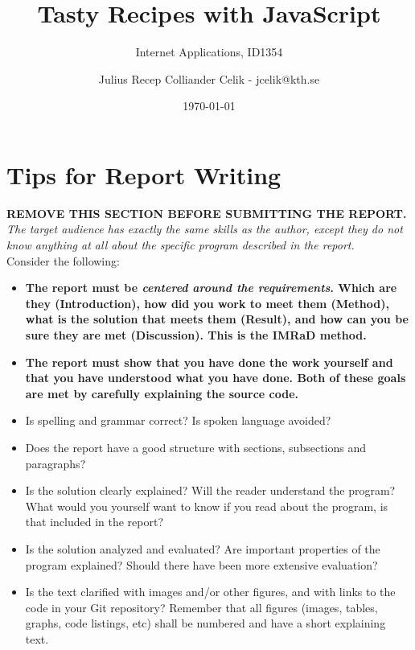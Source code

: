 \documentclass[a4paper]{scrartcl}
\title{Tasty Recipes with JavaScript}
\subtitle{Internet Applications, ID1354}
\author{Julius Recep Colliander Celik - jcelik@kth.se}
\date{\today}
\begin{document}
\maketitle

\section*{Tips for Report Writing}
\textbf{REMOVE THIS SECTION BEFORE SUBMITTING THE REPORT.}\\

\noindent \textit{The target audience has exactly the same skills as the author, except they do not know anything at all about the specific program described in the report.} \\

Consider the following:

\begin{itemize}
  \item \textbf{The report must be \textit{centered around the requirements}. Which are they (Introduction), how did you work to meet them (Method), what is the solution that meets them (Result), and how can you be sure they are met (Discussion). This is the IMRaD method.}

  \item \textbf{The report must show that you have done the work yourself and that you have understood what you have done. Both of these goals are met by carefully explaining the source code.}

  \item Is spelling and grammar correct? Is spoken language avoided?

  \item Does the report have a good structure with sections, subsections and paragraphs?

  \item Is the solution clearly explained? Will the reader understand the program? What would you yourself want to know if you read about the program, is that included in the report?

  \item Is the solution analyzed and evaluated? Are important properties of the program explained? Should there have been more extensive evaluation?

  \item Is the text clarified with images and/or other figures, and with links to the code in your Git repository? Remember that all figures (images, tables, graphs, code listings, etc) shall be numbered and have a short explaining text.
\end{itemize}
\end{document}
